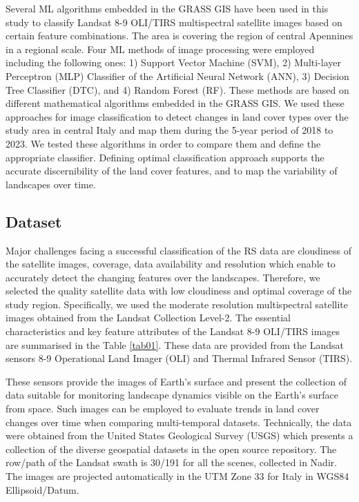 \documentclass[eprint,
approc,		%
]{actapoly}
\begin{document}
Several ML algorithms embedded in the GRASS GIS have been used in this study to classify Landsat 8-9 OLI/TIRS multispectral satellite images based on certain feature combinations. The area is covering the region of central Apennines in a regional scale. Four ML methods of image processing were employed including the following ones: 1) Support Vector Machine (SVM), 2) Multi-layer Perceptron (MLP) Classifier of the Artificial Neural Network (ANN), 3) Decision Tree Classifier (DTC), and 4) Random Forest (RF). These methods are based on different mathematical algorithms embedded in the GRASS GIS. We used these approaches for image classification to detect changes in land cover types over the study area in central Italy and map them during the 5-year period of 2018 to 2023. We tested these algorithms in order to compare them and define the appropriate classifier. Defining optimal classification approach supports the accurate discernibility of the land cover features, and to map the variability of landscapes over time.

\subsection{Dataset}

Major challenges facing a successful classification of the RS data are cloudiness of the satellite images, coverage, data availability and resolution which enable to accurately detect the changing features over the landscapes. Therefore, we selected the quality satellite data with low cloudiness and optimal coverage of the study region. Specifically, we used the moderate resolution multispectral satellite images obtained from the Landsat Collection Level-2. The essential characteristics and key feature attributes of the Landsat 8-9 OLI/TIRS images are summarised in the Table \ref{tab01}. These data are provided from the Landsat sensors 8-9 Operational Land Imager (OLI) and Thermal Infrared Sensor (TIRS). 

These sensors provide the images of Earth's surface and present the collection of data suitable for monitoring landscape dynamics visible on the Earth's surface from space. Such images can be employed to evaluate trends in land cover changes over time when comparing multi-temporal datasets. Technically, the data were obtained from the United States Geological Survey (USGS) which presents a collection of the diverse geospatial datasets in the open source repository. The row/path of the Landsat swath is 30/191 for all the scenes, collected in Nadir. The images are projected automatically in the UTM Zone 33 for Italy in WGS84 Ellipsoid/Datum. 
\end{document}
